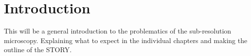 \chapter{Introduction}
This will be a general introduction to the problematics of the sub-resolution microscopy. Explaining what to expect in the individual chapters and making the outline of the STORY. 


